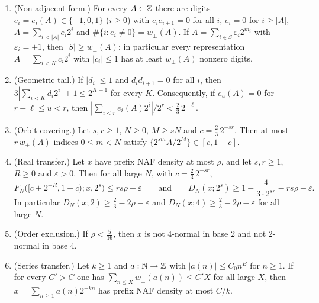 \documentclass[11pt]{article}
\newcommand{\wpm}{w_{\pm}}
\begin{document}
\begin{theorem}\label{thm:naf}
\begin{enumerate}[label=\textup{(\alph*)},nosep]
\item \textup{(Non-adjacent form.)} For every $A\in\mathbb Z$ there are digits $e_i=e_i(A)\in\{-1,0,1\}$ ($i\ge0$) with $e_ie_{i+1}=0$ for all $i$, $e_i=0$ for $i\ge|A|$, $A=\sum_{i<|A|}e_i2^i$ and $\#\{i:e_i\ne0\}=\wpm(A)$. If $A=\sum_{i\in S}\varepsilon_i2^{m_i}$ with $\varepsilon_i=\pm1$, then $|S|\ge\wpm(A)$; in particular every representation $A=\sum_{i<K}c_i2^i$ with $|c_i|\le1$ has at least $\wpm(A)$ nonzero digits.
\item \textup{(Geometric tail.)} If $|d_i|\le1$ and $d_id_{i+1}=0$ for all $i$, then $3|\sum_{i<K}d_i2^i|+1\le2^{K+1}$ for every $K$. Consequently, if $e_u(A)=0$ for $r-\ell\le u<r$, then $|\sum_{i<r}e_i(A)2^i|/2^r<\frac23\,2^{-\ell}$.
\item \textup{(Orbit covering.)} Let $s,r\ge1$, $N\ge0$, $M\ge sN$ and $c=\frac23\,2^{-sr}$. Then at most $r\,\wpm(A)$ indices $0\le m<N$ satisfy $\{2^{sm}A/2^M\}\in[c,1-c]$.
\item \textup{(Real transfer.)} Let $x$ have prefix NAF density at most $\rho$, and let $s,r\ge1$, $R\ge0$ and $\varepsilon>0$. Then for all large $N$, with $c=\frac23\,2^{-sr}$,
\[
F_N\bigl([c+2^{-R},1-c);x,2^s\bigr)\le rs\rho+\varepsilon\qquad\text{and}\qquad D_N(x;2^s)\ge1-\frac4{3\cdot2^{sr}}-rs\rho-\varepsilon.
\]
In particular $D_N(x;2)\ge\frac23-2\rho-\varepsilon$ and $D_N(x;4)\ge\frac23-2\rho-\varepsilon$ for all large $N$.
\item \textup{(Order exclusion.)} If $\rho<\frac5{16}$, then $x$ is not $4$-normal in base $2$ and not $2$-normal in base $4$.
\item \textup{(Series transfer.)} Let $k\ge1$ and $a:\mathbb N\to\mathbb Z$ with $|a(n)|\le C_0n^B$ for $n\ge1$. If for every $C'>C$ one has $\sum_{n\le X}\wpm(a(n))\le C'X$ for all large $X$, then $x=\sum_{n\ge1}a(n)2^{-kn}$ has prefix NAF density at most $C/k$.
\end{enumerate}
\end{theorem}
\end{document}
